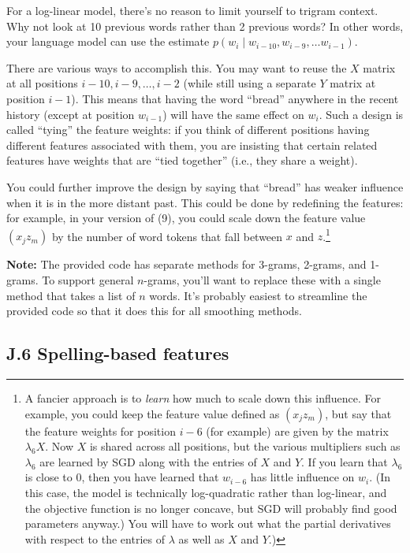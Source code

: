 \documentclass[12pt]{article}
\theoremstyle{plain}
\theoremstyle{definition}
\theoremstyle{remark}
\begin{document}
For a log-linear model, there’s no reason to limit yourself to trigram context. Why not look at 10 previous 
words rather than 2 previous words? In other words, your language model can use the estimate $p(w_i \mid w_{i-10}, w_{i-9}, \ldots w_{i-1})$. 

There are various ways to accomplish this. You may want to reuse the $X$ matrix at all positions $i-10, i-9, \ldots, i-2$ (while still using a separate $Y$ matrix at position $i-1$). This means that having the 
word “bread” anywhere in the recent history (except at position $w_{i-1}$) will have the same effect on $w_i$. Such 
a design is called “tying” the feature weights: if you think of different positions having different features 
associated with them, you are insisting that certain related features have weights that are “tied together” 
(i.e., they share a weight). 

You could further improve the design by saying that “bread” has weaker influence when it is in the more 
distant past. This could be done by redefining the features: for example, in your version of (9), you could 
scale down the feature value $(x_j z_m)$ by the number of word tokens that fall between $x$ and $z$.\footnote{A fancier approach is to \emph{learn} how much to scale down this influence. For example, you could keep the feature value defined as $(x_j z_m)$, but say that the feature weights for position $i-6$ (for example) are given by the matrix $\lambda_6 X$. Now $X$ is shared across all positions, but the various multipliers such as $\lambda_6$ are learned by SGD along with the entries of $X$ and $Y$. If you learn that $\lambda_6$ is close to 0, then you have learned that $w_{i-6}$ has little influence on $w_i$. (In this case, the model is technically log-quadratic rather than log-linear, and the objective function is no longer concave, but SGD will probably find good parameters anyway.) You will have to work out what the partial derivatives with respect to the entries of $\lambda$ as well as $X$ and $Y$.)}

\textbf{Note:} The provided code has separate methods for 3-grams, 2-grams, and 1-grams. To support general 
$n$-grams, you’ll want to replace these with a single method that takes a list of $n$ words. It’s probably easiest 
to streamline the provided code so that it does this for all smoothing methods. 

\subsection*{J.6 Spelling-based features}
\end{document}
